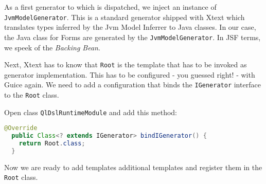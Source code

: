 As a first generator to which is dispatched, we inject an instance of
\texttt{JvmModelGenerator}. This is a standard generator shipped with Xtext which
translates types inferred by the Jvm Model Inferrer to Java classes.
In our case, the Java class for Forms are generated by the
\texttt{JvmModelGenerator}. In JSF terms, we speek of the \emph{Backing Bean}.
 
Next, Xtext has to know that \texttt{Root} is the template that has to be invoked
as generator implementation. This has to be configured - you guessed right! - 
with Guice again. We need to add a configuration that binds the \texttt{IGenerator}
interface to the \texttt{Root} class.

Open class \texttt{QlDslRuntimeModule} and add this method:

\begin{lstlisting}[language=Java]
  @Override
  public Class<? extends IGenerator> bindIGenerator() {
    return Root.class;
  }
\end{lstlisting}

Now we are ready to add templates additional templates and register them in the
\texttt{Root} class.


